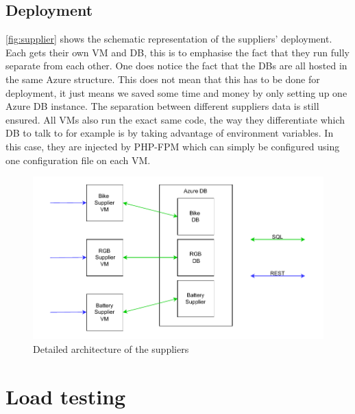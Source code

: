 \documentclass[10pt,a4paper,kul]{kulakarticle} %
\begin{document}
		\subsection{Deployment}
			\autoref{fig:supplier} shows the schematic representation of the suppliers' deployment. Each gets their own VM and DB, this is to emphasise the fact that they run fully separate from each other. One does notice the fact that the DBs are all hosted in the same Azure structure. This does not mean that this has to be done for deployment, it just means we saved some time and money by only setting up one Azure DB instance. The separation between different suppliers data is still ensured. All VMs also run the exact same code, the way they differentiate which DB to talk to for example is by taking advantage of environment variables. In this case, they are injected by PHP-FPM which can simply be configured using one configuration file on each VM. 
			\begin{figure}[h!]
				\centering
				\includegraphics[width=0.7\linewidth]{images/supplier}
				\caption{Detailed architecture of the suppliers}
				\label{fig:supplier}
			\end{figure}
		
	\section{Load testing}
		
\end{document}
